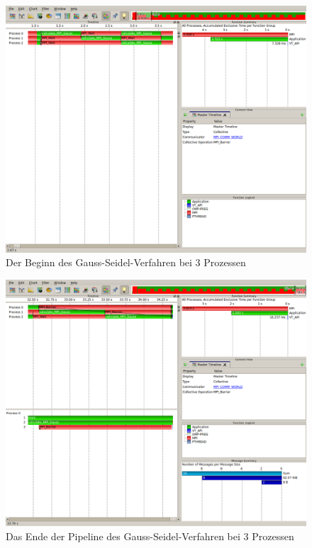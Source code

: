 \documentclass[a4paper,12pt]{scrartcl}
\begin{document}
\begin{figure}[hr!]
 \includegraphics[scale=0.45]{./3_2_GS/Start.png}
 \caption{Der Beginn des Gauss-Seidel-Verfahren bei 3 Prozessen}
\end{figure}
\begin{figure}[hr!]
 \includegraphics[scale=0.45]{./3_2_GS/End.png}
 \caption{Das Ende der Pipeline des Gauss-Seidel-Verfahren bei 3 Prozessen}
\end{figure}
\end{document}
